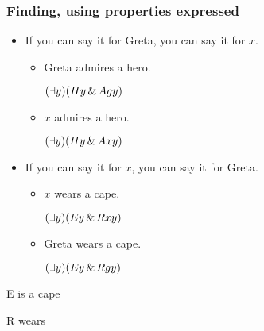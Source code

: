   \begin{frame}
    \frametitle{Finding, using properties expressed}
  
  \begin{itemize}[<+->]
    \item If you can say it for Greta, you can say it for $x$.
    \begin{itemize}[<+->]
      \item Greta admires a hero.
      \item[] \alert{$(\exists y)(Hy \,\&\, Agy)$}
      \item $x$ admires a hero.
      \item[] \alert{$(\exists y)(Hy \,\&\, Axy)$}
    \end{itemize}
    \item If you can say it for $x$, you can say it for Greta.
    \begin{itemize}[<+->]
      \item $x$ wears a cape.
      \item[] \alert{$(\exists y)(Ey \,\&\, Rxy)$}
      \item Greta wears a cape.
      \item[] \alert{$(\exists y)(Ey \,\&\, Rgy)$}
    \end{itemize}
  \end{itemize}
  \begin{ekey}\scriptsize
    \item[E\qv{x}]  is a cape
    \item[R\qr{x}{y}]  wears 
  \end{ekey}
  \end{frame}
  
